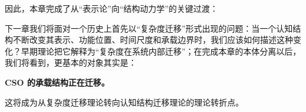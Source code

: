因此，本章完成了从“表示论”向“结构动力学”的关键过渡：
\begin{statementbox}
\centering
{}
\end{statementbox}

下一章我们将面对一个历史上首先以“复杂度迁移”形式出现的问题：当一个认知结构不断改变其表示、功能位置、时间尺度和承载边界时，我们应该如何描述这种变化？早期理论把它解释为“复杂度在系统内部迁移”；在完成本章的本体分离以后，我们将看到，更基本的对象其实是：
\begin{statementbox}
\centering\bfseries
CSO 的承载结构正在迁移。
\end{statementbox}
这将成为从复杂度迁移理论转向认知结构迁移理论的理论转折点。
